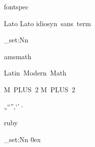 \RequirePackage
	{ fontspec }


\setmainfont
	{ Lato }
\setsansfont
	{ Lato }
\setmonofont
	{ idiosyn~sans~term }

\tl_set:Nn
	\familydefault
	\sfdefault

\RequirePackage
	{ amsmath }
\RequirePackage
	[ math-style = upright ]
	{ unicode-math }

\setmathfont
	{ Latin~Modern~Math }


\setCJKmainfont
	{ M~PLUS~2 }
\setCJKsansfont
	{ M~PLUS~2 }

\normalspacedchars
	{ „“”‚‘’· }

\RequirePackage
	{ ruby }

\tl_set:Nn
	\rubysep
	{ 0ex }
